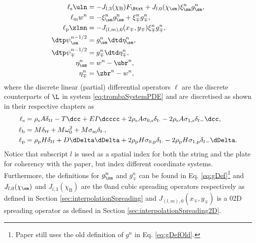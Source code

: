 \begin{subequations}\label{eq:trombaSystemFDS}
    \begin{align}
        \ell_\text{s}\uln &= -J_{l,3}(\chi_\text{B})F_\Btxt + J_{l,0}(\chi_\sm)\xi_\sm^n g^n_\sm,\label{eq:trombaSystemFDSString}\\
        \ell_\text{m}w^n &= - \xi_\sm^n g^n_\sm + \xi_\mp^n g^n_\mp,\label{eq:trombaSystemFDSMass}\\
        \ell_\text{p}\zlmn &= -J_{(l,m),0}(x_\mp, y_\mp)\xi_\mp^n g^n_\mp,\label{eq:trombaSystemFDSPlate}\\
        \dtp\psi^{n-1/2}_\sm &= g^n_\sm \dtd \eta^n_\sm,\label{eq:psiSM}\\
        \dtp\psi^{n-1/2}_\mp &= g^n_\mp \dtd \eta^n_\mp,\label{eq:psiMP}\\
        \eta^n_\sm &= w^n - \ubr^n,\label{eq:etaSM}\\
        \eta^n_\mp &= \zbr^n - w^n,\label{eq:etaMP}
    \end{align}
\end{subequations}
where the discrete linear (partial) differential operators $\ell$ are the discrete counterparts of $\L$ in system \eqref{eq:trombaSystemPDE} and are discretised as shown in their respective chapters as
\begin{subequations}\label{eq:fdsOperators}
\begin{align}
    \ell_\text{s} &=\rho_\text{s}A\delta_{tt}- T\dcc + EI\dcccc+ 2\rho_\text{s}A\sigma_{0,\text{s}}\delta_{t\cdot}-2\rho_\text{s}A\sigma_{1,\text{s}}\delta_{t-}\dcc,\\
    \ell_\text{b} &= M\delta_{tt} + M\omega_0^2 + M\sigma_\text{m} \delta_{t\cdot},\\
    \ell_\text{p} &= \rho_\text{p} H \delta_{tt} + D\dDelta\dDelta + 2\rho_\text{p}H\sigma_{0, \text{p}}\delta_{t\cdot} - 2\rho_\text{p}H\sigma_{1, \text{p}}\delta_{t-}\dDelta.
    \end{align}
\end{subequations}
Notice that subscript $l$ is used as a spatial index for both the string and the plate for coherency with the paper, but index different coordinate systems. Furthermore, the definitions for $g_\sm^n$ and $g_\mp^n$ can be found in Eq. \eqref{eq:gDef}\footnote{Paper \citeP[D] still uses the old definition of $g^n$ in Eq. \eqref{eq:gDefOld}.} and $J_{l,0}(\chi_\sm)$ and $J_{l,3}(\chi_\text{B})$ are the $0$\thOrder and cubic spreading operators respectively as defined in Section \ref{sec:interpolationSpreading} and $J_{(l,m),0}(x_\mp, y_\mp)$ is a $0$\thOrder 2D spreading operator as defined in Section \ref{sec:interpolationSpreading2D}.

